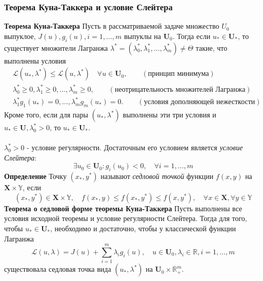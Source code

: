 \documentclass[A4]{article}
\begin{document}
\subsubsection{Теорема Куна-Таккера и условие Слейтера}
\textbf{Теорема Куна-Таккера} Пусть в рассматриваемой задаче множество $U_0$ выпуклое, $J(u),g_i(u),i=1,\ldots,m$ выпуклы на $\mathbf{U}_0$. Тогда если $u_*\in\mathbf{U}_*$, то существует множители Лагранжа $\lambda^*=(\lambda_0^*,\lambda_1^*,\ldots,\lambda_m^*)\ne\Theta$ такие, что выполнены условия
\begin{equation*}
\begin{aligned}
&\mathcal{L}(u_*,\lambda^*)\leqslant\mathcal{L}(u,\lambda^*)\quad\forall u\in\mathbf{U}_0,\qquad(\text{принцип минимума}) \\
&\lambda_0^*\geqslant 0,\lambda_1^*\geqslant 0,\ldots,\lambda_m^*\geqslant 0,\qquad(\text{неотрицательность множителей Лагранжа})\\
&\lambda_1^*g_1(u_*)=0,\ldots,\lambda_m^*g_m(u_*)=0. \qquad(\text{условия дополняющей нежесткости})
\end{aligned}
\end{equation*}
Кроме того, если для пары $(u_*,\lambda^*)$ выполнены эти три условия и $u_*\in\mathbf{U},\lambda_0^*>0$, то $u_*\in\mathbf{U}_*$.\\
\\
$\lambda_0^*>0$ - условие регулярности. Достаточным его условием является \emph{условие Слейтера}:
\begin{equation*}
\exists u_0\in\mathbf{U}_0:g_i(u_0)<0,\quad\forall i=1,\ldots,m
\end{equation*}
\textbf{Определение} Точку $(x_*,y^*)$ называют \emph{седловой точкой} функции $f(x,y)$ на $\mathbf{X}\times\mathbb{Y}$, если
\begin{equation*}
(x_*,y^*)\in\mathbf{X}\times\mathbb{Y},\quad f(x_*,y)\leqslant f(x_*,y^*)\leqslant f(x,y^*),\quad \forall x\in\mathbf{X},\forall y\in\mathbb{Y}
\end{equation*}
\textbf{Теорема о седловой форме теоремы Куна-Таккера} Пусть выполнены все условия исходной теоремы и условие регулярности Слейтера. Тогда для того, чтобы $u_*\in\mathbf{U}_*$, необходимо и достаточно, чтобы у классической функции Лагранжа
\begin{equation*}
\mathcal{L}(u,\lambda)=J(u)+\sum_{i=1}^{m}\lambda_ig_i(u),\quad u\in\mathbf{U}_0,\lambda_i\in\mathbb{R},i=1,\ldots,m
\end{equation*}
существовала седловая точка вида $(u_*,\lambda^*)$ на $\mathbf{U}_0\times \mathbb{R}_+^m$.
\end{document}
